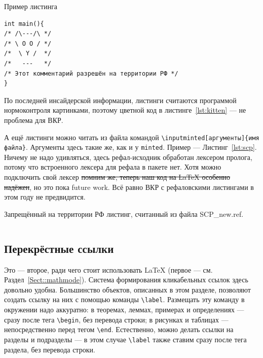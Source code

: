 \documentclass[14pt, russian]{scrartcl}
\begin{document}
\begin{listing}
\caption{Пример листинга}
\label{lst:kitten}
\begin{verbatim}
int main(){
/* /\---/\ */
/* \ O O / */
/*  \ Y /  */
/*   ---   */
/* Этот комментарий разрешён на территории РФ */
}
\end{verbatim}
\end{listing}

По последней инсайдерской информации, листинги считаются программой нормоконтроля картинками, поэтому цветной код в листинге~\ref{lst:kitten} --- не проблема для ВКР.

А ещё листинги можно читать из файла командой \texttt{\textbackslash inputminted[аргументы]\{имя файла\}}. Аргументы здесь такие же, как и у \texttt{minted}. Пример --- Листинг~\ref{lst:scp}. Ничему не надо удивляться, здесь рефал-исходник обработан лексером пролога, потому что встроенного лексера для рефала в пакете нет. Хотя можно подключить свой лексер \sout{помним же, теперь наш код на \LaTeX{} особенно надёжен}, но это пока future work. Всё равно ВКР с рефаловскими листингами в этом году не предвидится.

\begin{listing}[!htb]
\caption{Запрещённый на территории РФ листинг, считанный из файла SCP\_new.ref.}
\inputminted[frame=single,fontsize = \footnotesize, linenos, breaklines, xleftmargin = 1.5em,breaksymbol = ""]{prolog}{SCP_new.ref}
\label{lst:scp}
\end{listing}


\subsection{Перекрёстные ссылки}

Это --- второе, ради чего стоит использовать \LaTeX{} (первое --- см. Раздел~\ref{Sect::mathmode}). Система формирования кликабельных ссылок здесь довольно удобна. Большинство объектов, описанных в этом разделе, позволяют создать ссылку на них с помощью команды \texttt{\textbackslash{label}}. Размещать эту команду в окружении надо аккуратно: в теоремах, леммах, примерах и определениях --- сразу после тега \texttt{\textbackslash begin}, без перевода строки; в рисунках и таблицах --- непосредственно перед тегом \texttt{\textbackslash end}. Естественно, можно делать ссылки на разделы и подразделы --- в этом случае \texttt{\textbackslash label} также ставим сразу после тега раздела, без перевода строки.
\end{document}

